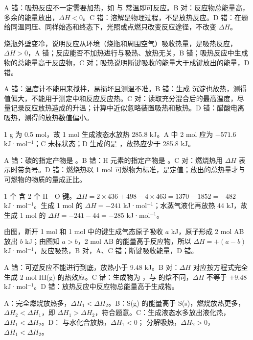 \begin{jiexilist}
\item {}A 错：吸热反应不一定需要加热，如  与  常温即可反应。B 对：反应物总能量高，多余的能量放出，$\Delta H<0$。C 错：溶解是物理过程，不是放热反应。D 错：在题给同温同压、同样始态和终态下，光照或点燃只改变反应途径，不改变 $\Delta H$。
\item {}烧瓶外壁变冷，说明反应从环境（烧瓶和周围空气）吸收热量，是吸热反应，$\Delta H>0$，A 错；反应能否不加热进行与吸热、放热无关，B 错；吸热反应中生成物的总能量高于反应物，C 对；吸热说明断键吸收的能量大于成键放出的能量，D 错。
\item {}A 错：温度计不能用来搅拌，易损坏且测温不准。B 错：生成  沉淀也放热，测得值偏大，不能用于测定中和反应反应热。C 对：读取充分混合后的最高温度，尽量记录反应放热造成的升温；计算中近似忽略装置吸热和散热。D 错：醋酸电离吸热，测得的放热数值偏小。
\item {}1 g  为 0.5 mol，故 1 mol  生成液态水放热 285.8 kJ。A 中 2 mol  应为 $-571.6$ kJ·mol$^{-1}$；C 未标状态；D 生成的是 ，放热应少于 285.8 kJ。
\item {}A 错：碳的指定产物是 。B 错：H 元素的指定产物是 。C 对：燃烧热用 $\Delta H$ 表示时带负号。D 错：燃烧热以 1 mol 可燃物为标准，是定值；放出的总热量才与可燃物的物质的量成正比。
\item {}1 个  含 2 个 H—O 键。$\Delta H=2\times436+498-4\times463=1370-1852=-482$ kJ·mol$^{-1}$。生成 1 mol  的 $\Delta H=-241$ kJ·mol$^{-1}$；水蒸气液化再放热 44 kJ，故生成 1 mol  的 $\Delta H=-241-44=-285$ kJ·mol$^{-1}$。
\item {}由图，断开 1 mol  和 1 mol  中的键生成气态原子吸收 $a$ kJ，原子形成 2 mol AB 放出 $b$ kJ；由图知 $a>b$，2 mol AB 的能量高于反应物，所以 $\Delta H=+(a-b)$ kJ·mol$^{-1}$，反应吸热，B 对，A、C 错；断键吸收能量，D 错。
\item {}A 错：可逆反应不能进行到底，放热小于 9.48 kJ。B 对：$\Delta H$ 对应按方程式完全生成 2 mol HI(g) 的热效应。C 错：生成物为 ，与  的焓不同，$\Delta H$ 不等于 $+9.48$ kJ·mol$^{-1}$。D 错：放热反应中反应物总能量高于生成物。
\item {}A：完全燃烧放热多，$\Delta H_1<\Delta H_2$。B：S(g) 的能量高于 S(s)，燃烧放热更多，$\Delta H_2<\Delta H_1$，即 $\Delta H_1>\Delta H_2$，符合题意。C：生成液态水多放出液化热，$\Delta H_1<\Delta H_2$。D： 与水化合放热，$\Delta H_1<0$； 分解吸热，$\Delta H_2>0$，$\Delta H_1<\Delta H_2$。

\end{jiexilist}
